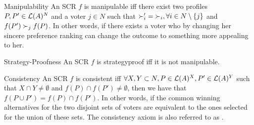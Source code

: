 	\begin{genthm}{Manipulability}
	An \acs{SCR} $f$ is manipulable iff there exist two profiles $P, P' \in\mathcal{L}(A)^{N}$ and a voter $j \in N$ such that $\mathbin{\pref'_i}=\mathbin{\prefi}, \forall i \in {N \setminus\{j\}}$ and $f(P') \succ_j f(P)$.
	In other words, if there exists a voter who by changing her sincere preference ranking can change the outcome to something more appealing to her.
	\end{genthm}

	\begin{genthm}{Strategy-Proofness}
		An \acs{SCR} $f$ is strategyproof iff it is not manipulable.
	\end{genthm}

	\begin{genthm}{Consistency}
		An \acs{SCR} $f$ is consistent iff $\forall X,Y \subset N, P \in\mathcal{L}(A)^{X}, P' \in\mathcal{L}(A)^{Y}$ such that $X \cap Y \neq \emptyset$ and $f(P)\cap f(P') \neq \emptyset$, then we have that $f(P \cup P')=f(P)\cap f(P')$. In other words, if the common winning alternatives for the two disjoint sets of voters are equivalent to the ones selected for the union of these sets.
		The consistency axiom is also referred to as .
	\end{genthm}

%
%
	
